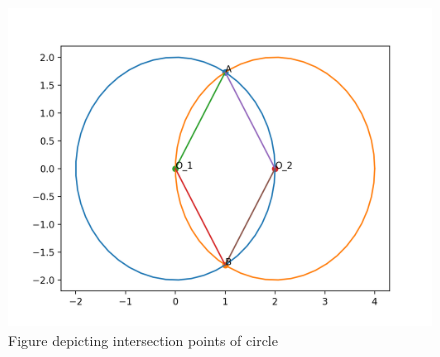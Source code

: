 \documentclass[journal,12pt,twocolumn]{IEEEtran}
\begin{document}
  \begin{figure}[h!]
	\centering
	\includegraphics[width=\columnwidth]{Assignment_5.png}
	\caption{Figure depicting intersection points of circle}
	\label{myfig}
\end{figure}
 
\end{document}
